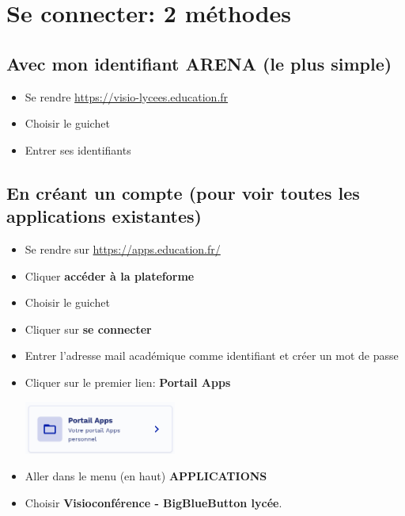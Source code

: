 \documentclass[a4paper,11pt]{article}
\begin{document}
\section{Se connecter: 2 méthodes}
\subsection{Avec mon identifiant ARENA (le plus simple)}
\begin{itemize}
    \item Se rendre \url{https://visio-lycees.education.fr}
    \item Choisir le guichet
    \item Entrer ses identifiants
\end{itemize}
\subsection{En créant un compte (pour voir toutes les applications existantes)}
\begin{itemize}
    \item Se rendre sur \url{https://apps.education.fr/}
    \item Cliquer \textbf{accéder à la plateforme}
    \item Choisir le guichet
    \item Cliquer sur \textbf{se connecter}
    \item Entrer l'adresse mail académique comme identifiant et créer un mot de passe
    \item Cliquer sur le premier lien: \textbf{Portail Apps}
\begin{center}
        \includegraphics[width=5cm]{ressources/lien.png}
    
\end{center}    \item Aller dans le menu (en haut) \textbf{APPLICATIONS}
    \item Choisir \textbf{Visioconférence - BigBlueButton lycée}.
\end{itemize}
\end{document}
